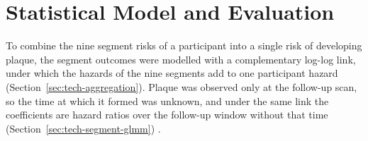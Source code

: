 \section{Statistical Model and Evaluation}
\label{sec:method-models}

To combine the nine segment risks of a participant into a single risk of developing plaque, the segment outcomes were modelled with a complementary log-log link, under which the hazards of the nine segments add to one participant hazard (Section~\ref{sec:tech-aggregation}).
Plaque was observed only at the follow-up scan, so the time at which it formed was unknown, and under the same link the coefficients are hazard ratios over the follow-up window without that time (Section~\ref{sec:tech-segment-glmm}) \cite[pp.~58--59]{prentice1978grouped}.


